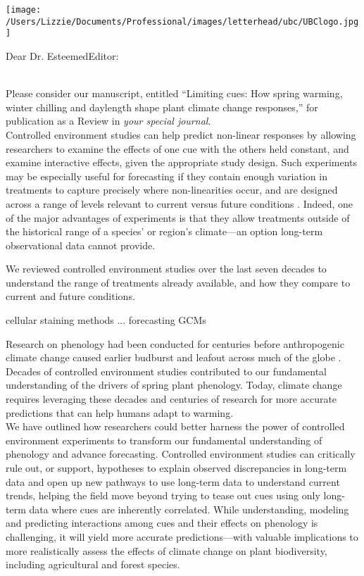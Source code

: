 \documentclass[12pt,a4paper]{letter}
\begin{document}
\begin{letter}{}
\texttt{[image: /Users/Lizzie/Documents/Professional/images/letterhead/ubc/UBClogo.jpg]}
\opening{Dear Dr. EsteemedEditor:}
\vspace{1.5ex}\\
Please consider our manuscript, entitled ``Limiting cues: How spring warming, winter chilling and daylength shape plant climate change responses,'' for publication as a Review in \emph{your special journal}. 
\vspace{1.5ex}\\

Controlled environment studies can help predict non-linear responses by allowing researchers to examine the effects of one cue with the others held constant, and examine interactive effects, given the appropriate study design. Such experiments may be especially useful for forecasting if they contain enough variation in treatments to capture precisely where non-linearities occur, and are designed across a range of levels relevant to current versus future conditions \citep{shen2015}. Indeed, one of the major advantages of experiments is that they allow treatments outside of the historical range of a species' or region's climate---an option long-term observational data cannot provide.

We reviewed controlled environment studies over the last seven decades to understand the range of treatments already available, and how they compare to current and future conditions.

cellular staining methods ...
forecasting GCMs

Research on phenology had been conducted for centuries before anthropogenic climate change caused earlier budburst and leafout across much of the globe \citep{Lamb:1948aa,Sparks:1995mv}. Decades of controlled environment studies contributed to our fundamental understanding of the drivers of spring plant phenology. Today, climate change requires leveraging these decades and centuries of research for more accurate predictions that can help humans adapt to warming. \\

We have outlined how researchers could better harness the power of controlled environment experiments to transform our fundamental understanding of phenology and advance forecasting. Controlled environment studies can critically rule out, or support, hypotheses to explain observed discrepancies in long-term data and open up new pathways to use long-term data to understand current trends, helping the field move beyond trying to tease out cues using only long-term data where cues are inherently correlated. While understanding, modeling and predicting interactions among cues and their effects on phenology is challenging, it will yield more accurate predictions---with valuable implications to more realistically assess the effects of climate change on plant biodiversity, including agricultural and forest species. 


\end{letter}
\end{document}
